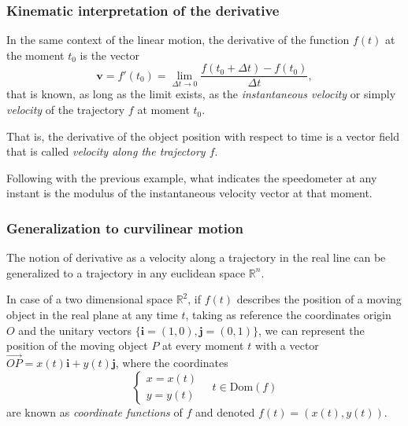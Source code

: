 \begin{frame}
\frametitle{Kinematic interpretation of the derivative}
In the same context of the linear motion, the derivative of the function $f(t)$ at the moment $t_0$ is the vector
\[
\mathbf{v}=f'(t_0)=\lim_{\Delta t\rightarrow 0}\frac{f(t_0+\Delta t)-f(t_0)}{\Delta t},
\]
that is known, as long as the limit exists, as the \emph{instantaneous velocity} or simply \emph{velocity} of the trajectory $f$ at moment $t_0$.

That is, the derivative of the object position with respect to time is a vector field that is called \emph{velocity along the trajectory $f$}.

Following with the previous example, what indicates the speedometer at any instant is the modulus of the instantaneous velocity vector at that moment.
\end{frame}


\begin{frame}
\frametitle{Generalization to curvilinear motion}
The notion of derivative as a velocity along a trajectory in the real line can be generalized to a trajectory in any euclidean space $\mathbb{R}^n$.

In case of a two dimensional space $\mathbb{R}^2$, if $f(t)$ describes the position of a moving object in the real plane at any time $t$, taking as reference the coordinates origin $O$ and the unitary vectors $\{\mathbf{i}=(1,0),\mathbf{j}=(0,1)\}$, we can represent the position of the moving object $P$ at every moment $t$ with a vector $\vec{OP}=x(t)\mathbf{i}+y(t)\mathbf{j}$, where the coordinates 
\[
\begin{cases}
x=x(t)\\
y=y(t)
\end{cases}
\quad
t\in \mbox{Dom}(f)
\]
are known as \emph{coordinate functions} of $f$ and denoted $f(t)=(x(t),y(t))$.

\begin{center}
\end{center}
\end{frame}



